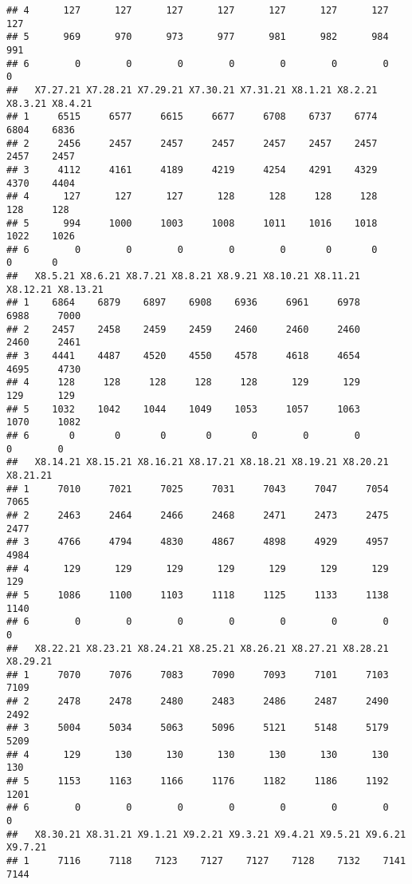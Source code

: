 \documentclass[
]{article}
\begin{document}
\begin{verbatim}
## 4      127      127      127      127      127      127      127      127
## 5      969      970      973      977      981      982      984      991
## 6        0        0        0        0        0        0        0        0
##   X7.27.21 X7.28.21 X7.29.21 X7.30.21 X7.31.21 X8.1.21 X8.2.21 X8.3.21 X8.4.21
## 1     6515     6577     6615     6677     6708    6737    6774    6804    6836
## 2     2456     2457     2457     2457     2457    2457    2457    2457    2457
## 3     4112     4161     4189     4219     4254    4291    4329    4370    4404
## 4      127      127      127      128      128     128     128     128     128
## 5      994     1000     1003     1008     1011    1016    1018    1022    1026
## 6        0        0        0        0        0       0       0       0       0
##   X8.5.21 X8.6.21 X8.7.21 X8.8.21 X8.9.21 X8.10.21 X8.11.21 X8.12.21 X8.13.21
## 1    6864    6879    6897    6908    6936     6961     6978     6988     7000
## 2    2457    2458    2459    2459    2460     2460     2460     2460     2461
## 3    4441    4487    4520    4550    4578     4618     4654     4695     4730
## 4     128     128     128     128     128      129      129      129      129
## 5    1032    1042    1044    1049    1053     1057     1063     1070     1082
## 6       0       0       0       0       0        0        0        0        0
##   X8.14.21 X8.15.21 X8.16.21 X8.17.21 X8.18.21 X8.19.21 X8.20.21 X8.21.21
## 1     7010     7021     7025     7031     7043     7047     7054     7065
## 2     2463     2464     2466     2468     2471     2473     2475     2477
## 3     4766     4794     4830     4867     4898     4929     4957     4984
## 4      129      129      129      129      129      129      129      129
## 5     1086     1100     1103     1118     1125     1133     1138     1140
## 6        0        0        0        0        0        0        0        0
##   X8.22.21 X8.23.21 X8.24.21 X8.25.21 X8.26.21 X8.27.21 X8.28.21 X8.29.21
## 1     7070     7076     7083     7090     7093     7101     7103     7109
## 2     2478     2478     2480     2483     2486     2487     2490     2492
## 3     5004     5034     5063     5096     5121     5148     5179     5209
## 4      129      130      130      130      130      130      130      130
## 5     1153     1163     1166     1176     1182     1186     1192     1201
## 6        0        0        0        0        0        0        0        0
##   X8.30.21 X8.31.21 X9.1.21 X9.2.21 X9.3.21 X9.4.21 X9.5.21 X9.6.21 X9.7.21
## 1     7116     7118    7123    7127    7127    7128    7132    7141    7144

\end{verbatim}
\end{document}
